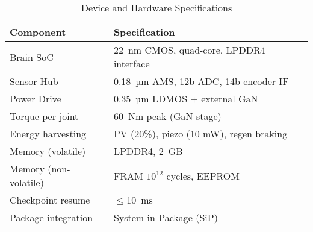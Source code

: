 \documentclass[journal]{IEEEtran}
\begin{document}
\begin{table}[h]
\centering
\caption{Device and Hardware Specifications}
\label{tab:device_specs}
\renewcommand{\arraystretch}{1.2}
\footnotesize
\begin{tabular}{p{4.2cm} p{3.6cm}}
\toprule
\textbf{Component} & \textbf{Specification} \\
\midrule
Brain SoC & 22~nm CMOS, quad-core, LPDDR4 interface \\
Sensor Hub & 0.18~µm AMS, 12b ADC, 14b encoder IF \\
Power Drive & 0.35~µm LDMOS + external GaN \\
Torque per joint & 60~Nm peak (GaN stage) \\
Energy harvesting & PV (20\%), piezo (10 mW), regen braking \\
Memory (volatile) & LPDDR4, 2~GB \\
Memory (non-volatile) & FRAM $10^{12}$ cycles, EEPROM \\
Checkpoint resume & $\leq$10~ms \\
Package integration & System-in-Package (SiP) \\
\bottomrule
\end{tabular}
\end{table}
\end{document}

